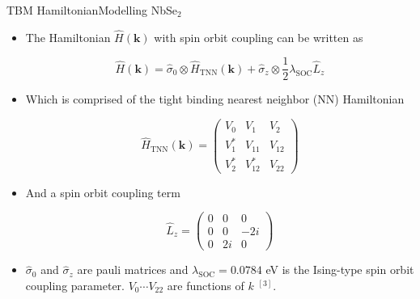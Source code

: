 \documentclass[9pt]{beamer}
\begin{document}
\begin{frame}{TBM Hamiltonian}{Modelling NbSe$_2$}
  \begin{itemize}
    \item{The Hamiltonian $\hat{H}(\boldsymbol{k})$ with spin orbit coupling can be written as

      \begin{equation}
        \hat{H}(\boldsymbol{k})=\hat{\sigma}_{0} \otimes \hat{H}_{\mathrm{TNN}}(\boldsymbol{k})+\hat{\sigma}_{z} \otimes \frac{1}{2} \lambda_{\mathrm{SOC}} \hat{L}_{z}
      \end{equation}
      }

    \item{Which is comprised of the tight binding nearest neighbor (NN) Hamiltonian

      \begin{equation}
        \hat{H}_{\mathrm{TNN}}(\boldsymbol{k})=\left(\begin{array}{ccc}
        V_{0} & V_{1} & V_{2} \\
        V_{1}^{*} & V_{11} & V_{12} \\
        V_{2}^{*} & V_{12}^{*} & V_{22}
        \end{array}\right)
      \end{equation}
      }

    \item{And a spin orbit coupling term

      \begin{equation}
        \hat{L}_{z}=\left(\begin{array}{ccc}
        0 & 0 & 0 \\
        0 & 0 & -2 i \\
        0 & 2 i & 0
        \end{array}\right)
      \end{equation}
    }

  \item $\hat{\sigma}_0$ and $\hat{\sigma}_z$ are pauli matrices and $\lambda_{\text{SOC}}=0.0784$ eV is the Ising-type spin orbit coupling parameter. $V_0 \cdots V_{22}$ are functions of $k$ $^{[3]}$.
  \end{itemize}
\end{frame}
\end{document}
